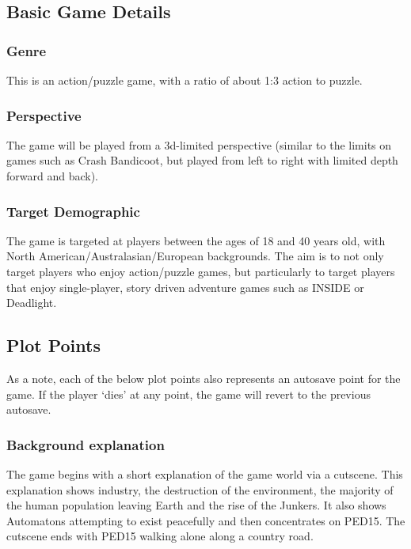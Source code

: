 \documentclass[journal]{IEEEtran}
\begin{document}
\subsection{Basic Game Details}
\subsubsection{Genre}
This is an action/puzzle game, with a ratio of about 1:3 action to puzzle.
\subsubsection{Perspective}
The game will be played from a 3d-limited perspective (similar to the limits on games such as Crash Bandicoot, but played from left to right with limited depth forward and back).
\subsubsection{Target Demographic}
The game is targeted at players between the ages of 18 and 40 years old, with North American/Australasian/European backgrounds. The aim is to not only target players who enjoy action/puzzle games, but particularly to target players that enjoy single-player, story driven adventure games such as INSIDE or Deadlight.
\subsection{Plot Points}
As a note, each of the below plot points also represents an autosave point for the game. If the player `dies' at any point, the game will revert to the previous autosave.
\subsubsection{Background explanation}
The game begins with a short explanation of the game world via a cutscene. This explanation shows industry, the destruction of the environment, the majority of the human population leaving Earth and the rise of the Junkers. It also shows Automatons attempting to exist peacefully and then concentrates on PED15. The cutscene ends with PED15 walking alone along a country road.
\end{document}
